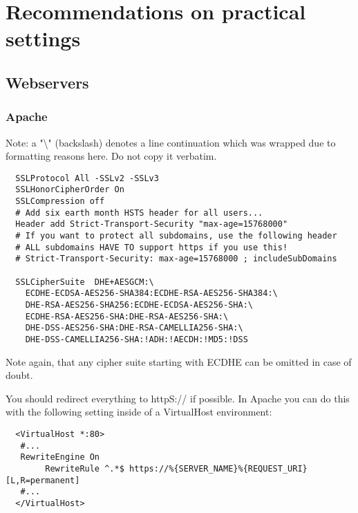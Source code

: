 \section{Recommendations on practical settings}


\subsection{Webservers}

\subsubsection{Apache}


Note: a "\textbackslash" (backslash) denotes a line continuation which was wrapped due to formatting reasons here. Do not copy it verbatim.

\begin{verbatim}
  SSLProtocol All -SSLv2 -SSLv3 
  SSLHonorCipherOrder On
  SSLCompression off
  # Add six earth month HSTS header for all users...
  Header add Strict-Transport-Security "max-age=15768000"
  # If you want to protect all subdomains, use the following header
  # ALL subdomains HAVE TO support https if you use this!
  # Strict-Transport-Security: max-age=15768000 ; includeSubDomains

  SSLCipherSuite  DHE+AESGCM:\
    ECDHE-ECDSA-AES256-SHA384:ECDHE-RSA-AES256-SHA384:\
    DHE-RSA-AES256-SHA256:ECDHE-ECDSA-AES256-SHA:\
    ECDHE-RSA-AES256-SHA:DHE-RSA-AES256-SHA:\
    DHE-DSS-AES256-SHA:DHE-RSA-CAMELLIA256-SHA:\
    DHE-DSS-CAMELLIA256-SHA:!ADH:!AECDH:!MD5:!DSS
\end{verbatim}

Note again, that any cipher suite starting with ECDHE  can be omitted in case of doubt.

You should redirect everything to httpS:// if possible. In Apache you can do this with the following setting inside of a VirtualHost environment:

\begin{verbatim}
  <VirtualHost *:80>
   #...
   RewriteEngine On
        RewriteRule ^.*$ https://%{SERVER_NAME}%{REQUEST_URI} [L,R=permanent]
   #...
  </VirtualHost>
\end{verbatim}



